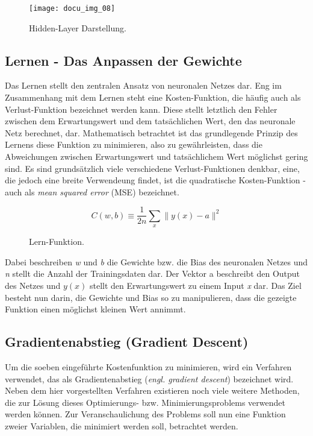 \begin{figure}[h]
    \centering
    \texttt{[image: docu\_img\_08]}
    \caption{Hidden-Layer Darstellung.}
    \label{fig:hidden-layers}
\end{figure}

\subsection{Lernen - Das Anpassen der Gewichte}

Das Lernen stellt den zentralen Ansatz von neuronalen Netzes dar. Eng im Zusammenhang mit dem Lernen steht eine
Kosten-Funktion, die häufig auch als Verlust-Funktion bezeichnet werden kann. Diese stellt letztlich den Fehler zwischen
dem Erwartungswert und dem tatsächlichen Wert, den das neuronale Netz berechnet, dar. Mathematisch betrachtet ist das
grundlegende Prinzip des Lernens diese Funktion zu minimieren, also zu gewährleisten, dass die Abweichungen zwischen
Erwartungswert und tatsächlichem Wert möglichst gering sind. Es sind grundsätzlich viele verschiedene Verlust-Funktionen
denkbar, eine, die jedoch eine breite Verwendeung findet, ist die quadratische Kosten-Funktion - auch als \textit{mean squared
error} (MSE) bezeichnet.

\begin{figure}[h]
    \centering
    \[ C(w, b) \equiv
          \frac{1}{2n}\displaystyle\sum_{x}{\parallel y(x) - a\parallel^2}
    \]
    \caption{Lern-Funktion.}
    \label{fig:learn-function}
\end{figure}

Dabei beschreiben \textit{w} und \textit{b} die Gewichte bzw. die Bias des neuronalen Netzes und \textit{n} stellt die Anzahl der Trainingsdaten
dar. Der Vektor a beschreibt den Output des Netzes und \textit{\(y(x)\)} stellt den Erwartungswert zu einem Input \textit{x} dar.
Das Ziel besteht nun darin, die Gewichte und Bias so zu manipulieren, dass die gezeigte Funktion einen möglichst kleinen
Wert annimmt.

\subsection{Gradientenabstieg (Gradient Descent)}

Um die soeben eingeführte Kostenfunktion zu minimieren, wird ein Verfahren verwendet, das als Gradientenabstieg (\textit{engl.
gradient descent}) bezeichnet wird. Neben dem hier vorgestellten Verfahren existieren noch viele weitere Methoden, die
zur Lösung dieses Optimierungs- bzw. Minimierungsproblems verwendet werden können.
Zur Veranschaulichung des Problems soll nun eine Funktion zweier Variablen, die minimiert werden soll, betrachtet werden.

